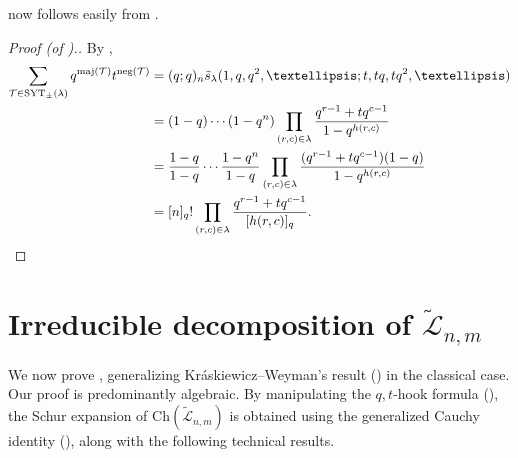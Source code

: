 \documentclass[11pt]{article}
\theoremstyle{definition}
\numberwithin{equation}{section}
\newcommand\maj{\mathrm{maj}}
\newcommand\negg{\mathrm{neg}}
\newcommand\SYT{\mathrm{SYT}}
\newcommand\Ltil{\widetilde{\mathcal{L}}}
\newcommand\stil{\tilde{s}}
\newcommand\Ch{\mathrm{Ch}}
\begin{document}
 now follows easily from .
\begin{proof}[Proof (of ).]
    By ,
    \begin{align*}
        \sum_{\mathcal{T} \in \SYT_\pm(\lambda)} q^{\maj(\mathcal{T})}t^{\negg(\mathcal{T})} &= (q;q)_n \stil_\lambda(1,q,q^2,\ldots;t,tq,tq^2,\ldots) \\
        &= (1-q) \cdots (1-q^n) \prod_{(r,c) \in \lambda} \frac{q^{r-1} + tq^{c-1}}{1-q^{h(r,c)}} \\
        &= \frac{1-q}{1-q} \cdots \frac{1-q^n}{1-q} \prod_{(r,c) \in \lambda} \frac{(q^{r-1} + tq^{c-1})(1-q)}{1-q^{h(r,c)}} \\
        &= [n]_q! \prod_{(r,c) \in \lambda} \frac{q^{r-1} + tq^{c-1}}{[h(r,c)]_q}. \qedhere
    \end{align*}
\end{proof}

\section{Irreducible decomposition of \texorpdfstring{$\Ltil_{n,m}$}{Ltilde-n,m}}\label{sec:super-KW}
We now prove , generalizing Kr{\'a}skiewicz--Weyman's result () in the classical case. Our proof is predominantly algebraic. By manipulating the $q,t$-hook formula (), the Schur expansion of $\Ch(\Ltil_{n,m})$ is obtained using the generalized Cauchy identity (), along with the following technical results.
\end{document}
